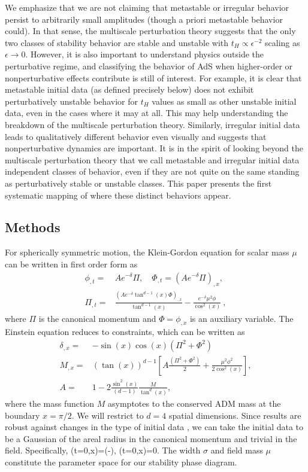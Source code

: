 \documentclass[../PhD.tex]{subfiles}
\begin{document}
We emphasize that we are not claiming that metastable or irregular behavior
persist to arbitrarily small amplitudes (though a priori metastable behavior
could). In that sense, the multiscale perturbation theory suggests  
that the only two classes of stability
behavior are stable and unstable with $t_H\propto\epsilon^{-2}$ scaling
as $\epsilon\to 0$. However, it is also important to understand physics
outside the perturbative regime, and classifying the behavior of AdS when
higher-order or nonperturbative effects contribute is still of interest.
For example, it is clear that metastable initial data (as defined precisely
below) does not exhibit perturbatively unstable behavior for $t_H$ values
as small as other unstable initial data, even in the cases where it may at all.
This may help understanding the breakdown of the multiscale perturbation theory.
Similarly, irregular initial data leads to qualitatively different behavior
even visually and suggests that nonperturbative dynamics are important.
It is in the spirit of looking beyond the multiscale perturbation theory that
we call metastable and irregular initial data independent classes of behavior, 
even if 
they are not quite on the same standing as perturbatively stable or unstable
classes. This paper presents the first systematic mapping of where these
distinct behaviors appear.


\subsection{Methods}\label{s:methods}

For spherically symmetric motion,
the Klein-Gordon equation for scalar mass $\mu$ can be written in first order
form as
\begin{align}
\phi_{,t}=&Ae^{-\delta}\Pi,\quad\Phi_{,t}=\left(Ae^{-\delta}\Pi\right)_{,x},
\label{evoleqns}\\
\Pi_{,t}=&\frac{(Ae^{-\delta}\tan^{d-1}(x)\Phi)_{,x}}{\tan^{d-1}(x)}-
\frac{e^{-\delta}\mu^2\phi}{\cos^2(x)}\ ,\label{KGequation}
\end{align}
where $\Pi$ is the canonical momentum and $\Phi=\phi_{,x}$ is an auxiliary
variable.  The Einstein equation reduces to constraints, which can be
written as
\begin{align}
  \label{deltaDeriv}
  \delta_{,x}=&-\sin(x)\cos(x)(\Pi^2+\Phi^2)\\
  \label{massDeriv}
  M_{,x}=&\left(\tan(x)\right)^{d-1}\left[
    A\frac{\left(\Pi^2+\Phi^2\right)}{2}+
    \frac{\mu^2\phi^2}{2\cos^2(x)}\right],\\
  A=&1-2\frac{\sin^2(x)}{(d-1)}\frac{M}{\tan^{d}(x)},
\end{align}
where the mass function $M$ asymptotes to the conserved ADM mass at the
boundary $x=\pi/2$.  We will restrict to $d=4$ spatial dimensions.
Since results are robust against changes in the type of
initial data \cite{1508.02709},
we can take the initial data to be a Gaussian of the areal radius in the
canonical momentum and trivial in the field.  Specifically,
\Pi(t=0,x)=\epsilon\exp\left(-\right),
\quad\phi(t=0,x)=0.
\eeq
The width $\sigma$ and field mass $\mu$ constitute the parameter space
for our stability phase diagram.
\end{document}
